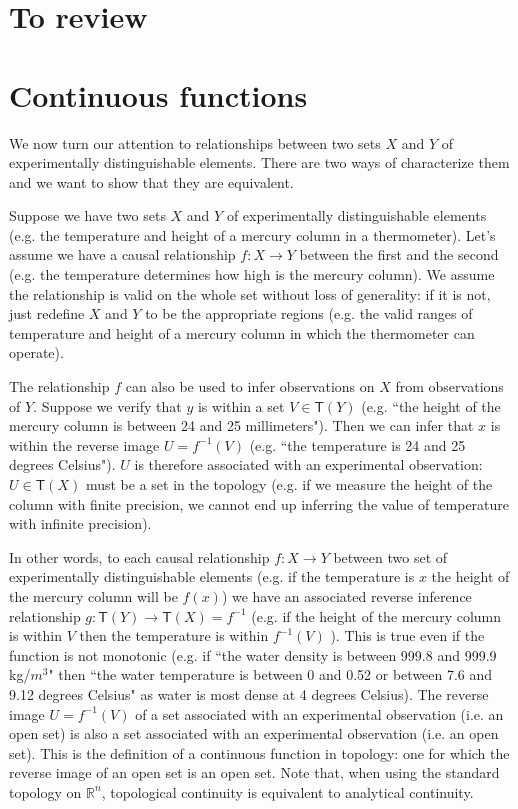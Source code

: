 \documentclass[11pt,letterpaper,fleqn]{memoir} %
\begin{document}
\section{To review}


\section{Continuous functions}

We now turn our attention to relationships between two sets $X$ and $Y$ of experimentally distinguishable elements. There are two ways of characterize them and we want to show that they are equivalent.

Suppose we have two sets $X$ and $Y$ of experimentally distinguishable elements (e.g. the temperature and height of a mercury column in a thermometer). Let's assume we have a causal relationship $f: X \rightarrow Y$ between the first and the second (e.g. the temperature determines how high is the mercury column). We assume the relationship is valid on the whole set without loss of generality: if it is not, just redefine $X$ and $Y$ to be the appropriate regions (e.g. the valid ranges of temperature and height of a mercury column in which the thermometer can operate).

The relationship $f$ can also be used to infer observations on $X$ from observations of $Y$. Suppose we verify that $y$ is within a set $V \in \mathsf{T}(Y)$ (e.g. ``the height of the mercury column is between 24 and 25 millimeters"). Then we can infer that $x$ is within the reverse image $U=f^{-1}(V)$ (e.g. ``the temperature is 24 and 25 degrees Celsius"). $U$ is therefore associated with an experimental observation: $U \in \mathsf{T}(X)$ must be a set in the topology (e.g. if we measure the height of the column with finite precision, we cannot end up inferring the value of temperature with infinite precision).

In other words, to each causal relationship $f: X \rightarrow Y$ between two set of experimentally distinguishable elements (e.g. if the temperature is $x$ the height of the mercury column will be $f(x)$) we have an associated reverse inference relationship $g  : \mathsf{T}(Y) \rightarrow \mathsf{T}(X) = f^{-1}$ (e.g. if the height of the mercury column is within $V$ then the temperature is within $f^{-1}(V)$ ). This is true even if the function is not monotonic (e.g. if ``the water density is between 999.8 and 999.9 kg/$m^3$" then ``the water temperature is between 0 and 0.52 or between 7.6 and 9.12 degrees Celsius" as water is most dense at 4 degrees Celsius).  The reverse image $U=f^{-1}(V)$ of a set associated with an experimental observation (i.e. an open set) is also a set associated with an experimental observation (i.e. an open set). This is the definition of a continuous function in topology: one for which the reverse image of an open set is an open set. Note that, when using the standard topology on $\mathbb{R}^n$, topological continuity is equivalent to analytical continuity.
\end{document}
